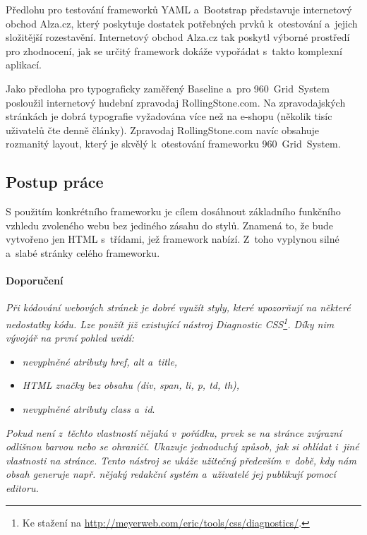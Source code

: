 \documentclass[thesis=B,czech]{FITthesis}[2012/06/26]
\begin{document}
Předlohu pro testování frameworků \gls{YAML} a~Bootstrap představuje internetový obchod Alza.cz, který poskytuje dostatek potřebných prvků k~otestování a~jejich složitější rozestavění. Internetový obchod Alza.cz tak poskytl výborné prostředí pro zhodnocení, jak se určitý framework dokáže vypořádat s~takto komplexní aplikací.

Jako předloha pro typograficky zaměřený Baseline a~pro 960~Grid~System posloužil internetový hudební zpravodaj RollingStone.com. Na zpravodajských stránkách je dobrá typografie vyžadována více než na e-shopu (několik tisíc uživatelů čte denně články). Zpravodaj RollingStone.com  navíc obsahuje rozmanitý layout, který je skvělý k~otestování frameworku 960~Grid~System. 



\subsection{Postup práce}

S použitím konkrétního frameworku je cílem dosáhnout základního funkčního vzhledu zvoleného webu bez jediného zásahu do stylů. Znamená to, že bude vytvořeno jen \gls{HTML} s~třídami, jež framework nabízí. Z~toho vyplynou silné a~slabé stránky celého frameworku. 


\paragraph{Doporučení}

 \textit{Při kódování webových stránek je dobré využít styly, které upozorňují na některé nedostatky kódu. Lze použít již existující nástroj Diagnostic CSS\footnote{Ke stažení na \url{http://meyerweb.com/eric/tools/css/diagnostics/}.}. Díky nim vývojář na první pohled uvidí: }

\begin{itemize}
 \item \textit{nevyplněné atributy href, alt a~title,}
 \item \textit{\gls{HTML} značky bez obsahu (div, span, li, p, td, th),}
 \item \textit{nevyplněné atributy class a~id}.
\end{itemize}
\textit{Pokud není z~těchto vlastností nějaká v~pořádku, prvek se na stránce zvýrazní odlišnou barvou nebo se ohraničí. Ukazuje jednoduchý způsob, jak si ohlídat i~jiné vlastnosti na stránce. Tento nástroj se ukáže užitečný především v~době, kdy nám obsah generuje např. nějaký redakční systém a~uživatelé jej publikují pomocí editoru.}
\end{document}
